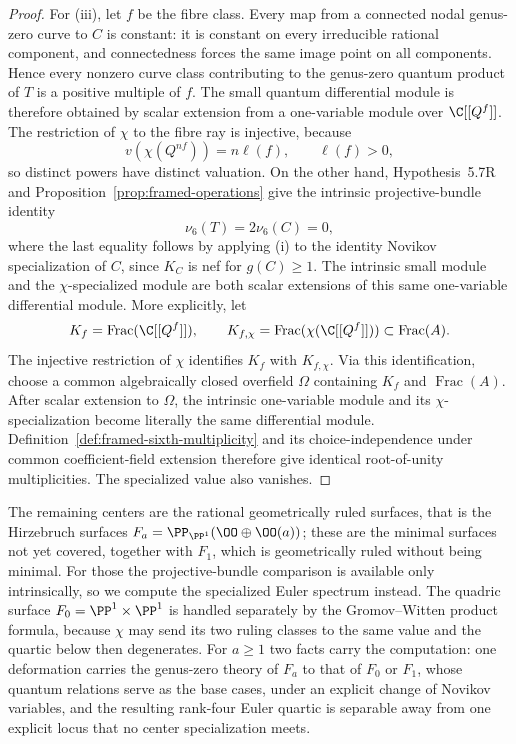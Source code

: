 \begin{proof}
For (iii), let \(f\) be the fibre class.  Every map from a connected
nodal genus-zero curve to \(C\) is constant: it is constant on every
irreducible rational component, and connectedness forces the same image
point on all components.  Hence every nonzero curve class contributing to
the genus-zero quantum product of \(T\) is a positive multiple of \(f\).
The small quantum differential module is therefore obtained by scalar
extension from a one-variable module over \(\C[[Q^f]]\).  The restriction
of \(\chi\) to the fibre ray is injective, because
\[
 v(\chi(Q^{nf}))=n\ell(f),
 \qquad \ell(f)>0,
\]
so distinct powers have distinct valuation.  On the other hand,
Hypothesis~5.7R and Proposition~\ref{prop:framed-operations} give the
intrinsic projective-bundle identity
\[
 \nu_6(T)=2\nu_6(C)=0,
\]
where the last equality follows by applying (i) to the identity Novikov
specialization of \(C\), since \(K_C\) is nef for \(g(C)\ge1\).
The intrinsic small module and the \(\chi\)-specialized module are both
scalar extensions of this same one-variable differential module.  More
explicitly, let
\[
 K_f=\operatorname{Frac}(\C[[Q^f]]),
 \qquad
 K_{f,\chi}=\operatorname{Frac}(\chi(\C[[Q^f]]))
 \subset\operatorname{Frac}(A).
\]
The injective restriction of \(\chi\) identifies \(K_f\) with
\(K_{f,\chi}\).  Via this identification, choose a common algebraically
closed overfield \(\Omega\) containing \(K_f\) and
\(\operatorname{Frac}(A)\).  After scalar extension to \(\Omega\), the
intrinsic one-variable module and its \(\chi\)-specialization become
literally the same differential module.  Definition~\ref{def:framed-sixth-multiplicity} and
its choice-independence under common coefficient-field extension therefore
give identical root-of-unity multiplicities.  The specialized value also
vanishes.
\end{proof}

The remaining centers are the rational geometrically ruled surfaces, that is the
Hirzebruch surfaces \(F_a=\PP_{\PP^1}(\OO\oplus\OO(a))\); these are the minimal
surfaces not yet covered, together with \(F_1\), which is geometrically ruled
without being minimal.  For those the projective-bundle
comparison is available only intrinsically, so we compute the specialized Euler
spectrum instead.  The quadric surface \(F_0=\PP^1\times\PP^1\) is handled
separately by the Gromov--Witten product formula, because \(\chi\) may send its
two ruling classes to the same value and the quartic below then degenerates.  For
\(a\ge1\) two facts carry the computation: one deformation carries the
genus-zero theory of \(F_a\) to that of \(F_0\) or \(F_1\), whose quantum
relations serve as the base cases, under an explicit change of Novikov
variables, and the resulting rank-four Euler quartic is
separable away from one explicit locus that no center specialization meets.

